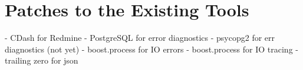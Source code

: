 \documentclass[deska]{subfiles}
\begin{document}
\chapter{Patches to the Existing Tools}
\label{sec:patches}

\begin{abstract}
\end{abstract}

- CDash for Redmine
- PostgreSQL for error diagnostics
- psycopg2 for err diagnostics (not yet)
- boost.process for IO errors
- boost.process for IO tracing
- trailing zero for json
\end{document}
